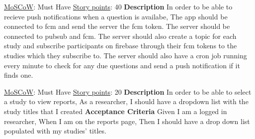 \documentclass[12pt, a4paper]{report}
\begin{document}
\begin{tcolorbox}[width=\textwidth,colback={White},title={\textbf {Creating push notifications}},colbacktitle=grey,coltitle=black]
\underline{MoSCoW}: Must Have
\hfill
\underline {Story points}: 40
\newline
\newline
\blindtext \textbf{Description}
\newline
In order to be able to recieve push notifications when a question is availabe,
\newline
The app should be connected to fcm and send the server the fcm token.
\newline
\newline
The server should be connected to pubsub and fcm. The server should also create a topic for each study and subscribe participants on firebase through their fcm tokens to the studies which they subscribe to.
\newline
\newline
The server should also have a cron job running every minute to check for any due questions and send a push notification if it finds one.
\end{tcolorbox} 

\vspace*{20px}

\begin{tcolorbox}[width=\textwidth,colback={White},title={\textbf {Return list of Studies associated to a reporter}},colbacktitle=grey,coltitle=black]
\underline{MoSCoW}: Must Have
\hfill
\underline {Story points}: 20
\newline
\newline
\blindtext \textbf{Description}
\newline
In order to be able to select a study to view reports,
\newline
As a researcher,
\newline
I should have a dropdown list with the study titles that I created
\newline
\newline
 \textbf{Acceptance Criteria}
 \newline
Given I am a logged in researcher,
\newline
When I am on the reports page,
\newline
Then I should have a drop down list populated with my studies' titles.
\end{tcolorbox} 

\vspace*{20px}
\end{document}
